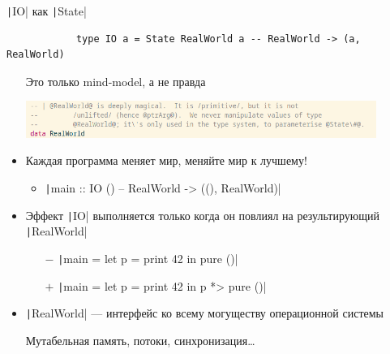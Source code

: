 
    \begin{frame}[fragile]{\texttt|IO| как \texttt|State|}
        \vspace{-0.5em}
        \pause
        \begin{verbatim}
            type IO a = State RealWorld a -- RealWorld -> (a, RealWorld)
        \end{verbatim}
        \begin{itemize}
            \item[\NB] Это только mind-model, а не правда
            \begin{center}
                \includegraphics[width=0.9\textwidth]{figs/real_world}
            \end{center}
            \item Каждая программа меняет мир, меняйте мир к лучшему!
            \begin{itemize}
                \item \texttt|main :: IO () -- RealWorld -> ((), RealWorld)|
            \end{itemize}
            \item Эффект \texttt|IO| выполняется только когда он повлиял на результирующий \texttt|RealWorld|
            \begin{itemize}
                \item[$-$] \texttt|main = let p = print 42 in pure ()|
                \item[$+$] \texttt|main = let p = print 42 in p *> pure ()|
            \end{itemize}
            \item \texttt|RealWorld| --- интерфейс ко всему могуществу операционной системы
            \item[\eg] Мутабельная память, потоки, синхронизация\ldots
        \end{itemize}
    \end{frame}

